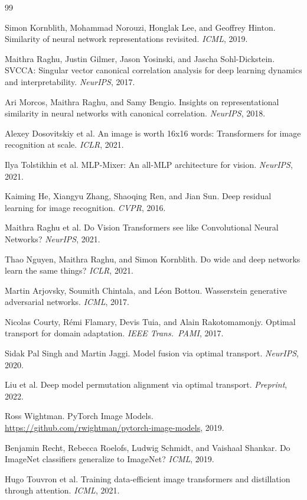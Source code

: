 \documentclass[11pt]{article}
\begin{document}

\begin{thebibliography}{99}

Simon Kornblith, Mohammad Norouzi, Honglak Lee, and Geoffrey Hinton.
Similarity of neural network representations revisited.
\emph{ICML}, 2019.

Maithra Raghu, Justin Gilmer, Jason Yosinski, and Jascha Sohl-Dickstein.
SVCCA: Singular vector canonical correlation analysis for deep
learning dynamics and interpretability. \emph{NeurIPS}, 2017.

Ari Morcos, Maithra Raghu, and Samy Bengio.
Insights on representational similarity in neural networks with
canonical correlation. \emph{NeurIPS}, 2018.

Alexey Dosovitskiy et al.
An image is worth 16x16 words: Transformers for image recognition at
scale. \emph{ICLR}, 2021.

Ilya Tolstikhin et al.
MLP-Mixer: An all-MLP architecture for vision. \emph{NeurIPS}, 2021.

Kaiming He, Xiangyu Zhang, Shaoqing Ren, and Jian Sun.
Deep residual learning for image recognition. \emph{CVPR}, 2016.

Maithra Raghu et al.
Do Vision Transformers see like Convolutional Neural Networks?
\emph{NeurIPS}, 2021.

Thao Nguyen, Maithra Raghu, and Simon Kornblith.
Do wide and deep networks learn the same things?
\emph{ICLR}, 2021.

Martin Arjovsky, Soumith Chintala, and L\'eon Bottou.
Wasserstein generative adversarial networks. \emph{ICML}, 2017.

Nicolas Courty, R\'emi Flamary, Devis Tuia, and Alain Rakotomamonjy.
Optimal transport for domain adaptation.
\emph{IEEE Trans.\ PAMI}, 2017.

Sidak Pal Singh and Martin Jaggi.
Model fusion via optimal transport. \emph{NeurIPS}, 2020.

Liu et al. Deep model permutation alignment via optimal transport.
\emph{Preprint}, 2022.

Ross Wightman.
PyTorch Image Models.
\url{https://github.com/rwightman/pytorch-image-models}, 2019.

Benjamin Recht, Rebecca Roelofs, Ludwig Schmidt, and Vaishaal Shankar.
Do ImageNet classifiers generalize to ImageNet?
\emph{ICML}, 2019.

Hugo Touvron et al.
Training data-efficient image transformers and distillation through
attention. \emph{ICML}, 2021.

\end{thebibliography}
\end{document}

